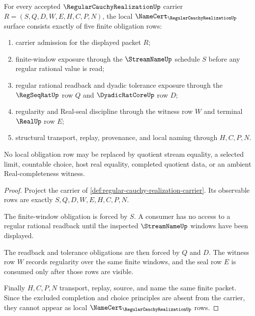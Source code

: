 \begin{theorem}
\label{thm:regular-cauchy-realization-namecert-obligations}
For every accepted $\RegularCauchyRealizationUp$ carrier $R=(S,Q,D,W,E,H,C,P,N)$, the local $\NameCert_{\RegularCauchyRealizationUp}$ surface consists exactly of five finite obligation rows:
\begin{enumerate}
\item carrier admission for the displayed packet $R$;
\item finite-window exposure through the $\StreamNameUp$ schedule $S$ before any regular rational value is read;
\item regular rational readback and dyadic tolerance exposure through the $\RegSeqRatUp$ row $Q$ and $\DyadicRatCoreUp$ row $D$;
\item regularity and Real-seal discipline through the witness row $W$ and terminal $\RealUp$ row $E$;
\item structural transport, replay, provenance, and local naming through $H,C,P,N$.
\end{enumerate}
No local obligation row may be replaced by quotient stream equality, a selected limit, countable choice, host real equality, completed quotient data, or an ambient Real-completeness witness.
\end{theorem}
\begin{proof}
Project the carrier of \autoref{def:regular-cauchy-realization-carrier}. Its observable rows are exactly $S,Q,D,W,E,H,C,P,N$.

The finite-window obligation is forced by $S$. A consumer has no access to a regular rational readback until the inspected $\StreamNameUp$ windows have been displayed.

The readback and tolerance obligations are then forced by $Q$ and $D$. The witness row $W$ records regularity over the same finite windows, and the seal row $E$ is consumed only after those rows are visible.

Finally $H,C,P,N$ transport, replay, source, and name the same finite packet. Since the excluded completion and choice principles are absent from the carrier, they cannot appear as local $\NameCert_{\RegularCauchyRealizationUp}$ rows.
\end{proof}

